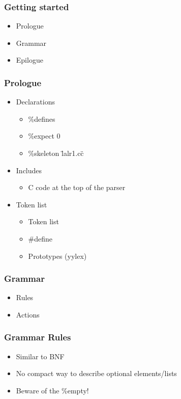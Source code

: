 \begin{frame}
  \frametitle{Getting started}
    \begin{itemize}[<+->]
      \item Prologue
      \item Grammar
      \item Epilogue
    \end{itemize}
\end{frame}

\begin{frame}
  \frametitle{Prologue}
    \begin{itemize}[<+->]
      \item Declarations
      \begin{itemize}[<+->]
        \item \%defines
        \item \%expect 0
        \item \%skeleton \"lalr1.cc\"
      \end{itemize}
      \item Includes
      \begin{itemize}[<+->]
        \item C code at the top of the parser
      \end{itemize}
      \item Token list
      \begin{itemize}[<+->]
        \item Token list
        \item #define
        \item Prototypes (yylex)
      \end{itemize}
  \end{itemize}
\end{frame}

\begin{frame}
  \frametitle{Grammar}
    \begin{itemize}[<+->]
      \item Rules
      \item Actions
    \end{itemize}
\end{frame}

\begin{frame}
  \frametitle{Grammar Rules}
    \begin{itemize}[<+->]
      \item Similar to BNF
      \item No compact way to describe optional elements/lists
      \item Beware of the \%empty!
    \end{itemize}
\end{frame}


